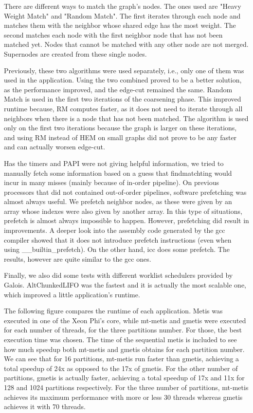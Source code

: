 \documentclass[abstract=on,9pt,twocolumn]{scrartcl}
\begin{document}
There are different ways to match the graph's nodes. The ones used are
"Heavy Weight Match" and "Random Match". The first iterates through each
node and matches them with the neighbor whose shared edge has the most
weight. The second matches each node with the first neighbor node that
has not been matched yet. Nodes that cannot be matched with any other
node are not merged. Supernodes are created from these single nodes.

Previously, these two algorithms were used separately, i.e., only one of
them was used in the application. Using the two combined proved to be a
better solution, as the performance improved, and the edge-cut remained
the same. Random Match is used in the first two iterations of the
coarsening phase. This improved runtime because, RM computes faster, as
it does not need to iterate through all neighbors when there is a node
that has not been matched. The algorithm is used only on the first two
iterations because the graph is larger on these iterations, and using RM
instead of HEM on small graphs did not prove to be any faster and can
actually worsen edge-cut.

Has the timers and PAPI were not giving helpful information, we tried to
manually fetch some information based on a guess that findmatchting
would incur in many misses (mainly because of in-order pipeline). On
previous processors that did not contained out-of-order pipelines,
software prefetching was almost always useful. 
We prefetch neighbor nodes, as these were given by an array whose
indexes were also given by another array. In this type of situations,
prefetch is almost always impossible to happen. 
However, prefetching did result in improvements.
A deeper look into the assembly code generated by the gcc compiler 
showed that it does not introduce prefetch instructions (even when using
\_\_builtin\_prefetch). On the other hand, icc does some prefetch. The results,
however are quite similar to the gcc ones.

Finally, we also did some tests with different worklist schedulers provided by
Galois. AltChunkedLIFO was the fastest and it is actually the most
scalable one, which improved a little application's runtime.


The following figure compares the runtime of each application. Metis was
executed in one of the Xeon Phi's core, while mt-metis and gmetis were
executed for each number of threads, for the three partitions number.
For those, the best execution time was chosen. The time of the
sequential metis is included to see how much speedup both mt-metis and
gmetis obtains for each partition number. We can see that for 16
partitions, mt-metis run faster than gmetis, achieving a total speedup
of 24x as opposed to the 17x of gmetis. For the other number of partitions,
gmetis is actually faster, achieving a total speedup of 17x and 11x for
128 and 1024 partitions respectively. For the three number of partitions, mt-metis
achieves its maximum performance with more or less 30 threads whereas
gmetis achieves it with 70 threads.
\end{document}
